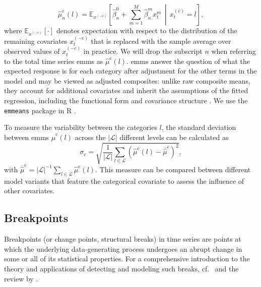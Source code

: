 \begin{equation}\label{eq:EMM}
    \hat{\mu}^c_n(l)
    =
    \mathbb{E}_{x^{(-c)}}\!\left[
        \hat{\beta}^0_n + \sum_{m=1}^M \hat{\beta}^m_n x^m_t \,\middle|\, x^{(c)}_t = l
        \right],
\end{equation}
where $\mathbb{E}_{x^{(-c)}}[\cdot]$ denotes expectation with respect to the distribution of the remaining covariates $x^{(-c)}_t$ that is replaced with the sample average over observed values of $x_t^{(-c)}$ in practice. We will drop the subscript $n$ when referring to the total time series \glspl{emm} as $\hat{\mu}^c(l)$. \glspl{emm} answer the question of what the expected response is for each category after adjustment for the other terms in the model and may be viewed as adjusted composites: unlike raw composite means, they account for additional covariates and inherit the assumptions of the fitted regression, including the functional form and covariance structure \parencite{searlePopulationMarginalMeans1980}. We use the \texttt{emmeans} package in R \parencite{lenthEmmeansEstimatedMarginal2026}.

To measure the variability between the categories $l$, the standard deviation between \glspl{emm} $\hat{\mu}^{\mathrm{c}}(l)$ across the $|\mathcal{L}|$ different levels can be calculated as
\begin{equation} \label{eq:stdEMM}
    \sigma_{\mathrm{c}}= \sqrt{\frac{1}{|\mathcal{L}|}\sum_{l\in\mathcal{L}}
    \left(\hat{\mu}^{\mathrm{c}}(l) - \overline{\hat{\mu}}^{\mathrm{c}}\right)^{\!2}},
\end{equation}
with $\overline{\hat{\mu}}^{\mathrm{c}} = |\mathcal{L}|^{-1}\sum_{l\in\mathcal{L}}\hat{\mu}^{\mathrm{c}}(l)$. This measure can be compared between different model variants that feature the categorical covariate to assess the influence of other covariates.


\subsection{Breakpoints}\label{sec:EDA_brk}
Breakpoints (or change points, structural breaks) in time series are points at which the underlying data‐generating process undergoes an abrupt change in some or all of its statistical properties. For a comprehensive introduction to the theory and applications of detecting and modeling such breaks, cf.~\textcite{chenParametricStatisticalChange2012} and the review by \textcite{truongSelectiveReviewOffline2020}.

